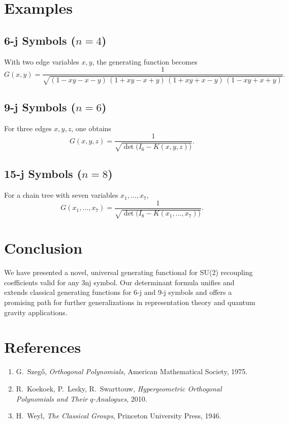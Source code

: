 \documentclass[11pt]{article}
\begin{document}
\section{Examples}
\subsection{6-j Symbols ($n=4$)}
With two edge variables $x,y$, the generating function becomes
\begin{equation}\label{eq:6j}
  \boxed{
  G(x,y)
  = \frac{1}{\sqrt{(1 - x y - x - y)\,(1 + x y - x + y)\,(1 + x y + x - y)\,(1 - x y + x + y)}}.
  }
\end{equation}

\subsection{9-j Symbols ($n=6$)}
For three edges $x,y,z$, one obtains
\begin{equation}\label{eq:9j}
  \boxed{
  G(x,y,z)
  = \frac{1}{\sqrt{\det\!\bigl(I_6 - K(x,y,z)\bigr)}}.
  }
\end{equation}

\subsection{15-j Symbols ($n=8$)}
For a chain tree with seven variables $x_1,\dots,x_7$,
\begin{equation}\label{eq:15j}
  \boxed{
  G(x_1,\dots,x_7)
  = \frac{1}{\sqrt{\det\!\bigl(I_8 - K(x_1,\dots,x_7)\bigr)}}.
  }
\end{equation}

\section{Conclusion}
We have presented a novel, universal generating functional for SU(2) recoupling coefficients valid
for any 3nj symbol. Our determinant formula unifies and extends classical generating functions for
6-j and 9-j symbols and offers a promising path for further generalizations in representation theory
and quantum gravity applications.

\section*{References}
\begin{enumerate}
  \item G.~Szeg\H{o}, \emph{Orthogonal Polynomials}, American Mathematical Society, 1975.
  \item R.~Koekoek, P.~Lesky, R.~Swarttouw, \emph{Hypergeometric Orthogonal Polynomials and Their $q$-Analogues}, 2010.
  \item H.~Weyl, \emph{The Classical Groups}, Princeton University Press, 1946.
\end{enumerate}
\end{document}
